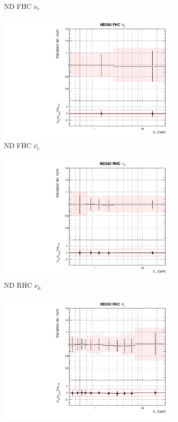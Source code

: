 \begin{figure}[!htbp]
\begin{subfigure}{0.45\textwidth}
  \caption{ND FHC $\nu_e$}
\end{subfigure}
\begin{subfigure}{0.45\textwidth}
  \centering
  \includegraphics[width=0.75\linewidth]{figs/asmvfluxpoly3}
  \caption{ND FHC $\bar{\nu_{e}}$}
\end{subfigure}
\begin{subfigure}{0.45\textwidth}
  \centering
  \includegraphics[width=0.75\linewidth]{figs/asmvfluxpoly4}
  \caption{ND RHC $\nu_{\mu}$}
\end{subfigure}
\begin{subfigure}{0.45\textwidth}
  \centering
  \includegraphics[width=0.75\linewidth]{figs/asmvfluxpoly5}

\end{subfigure}
\end{figure}

